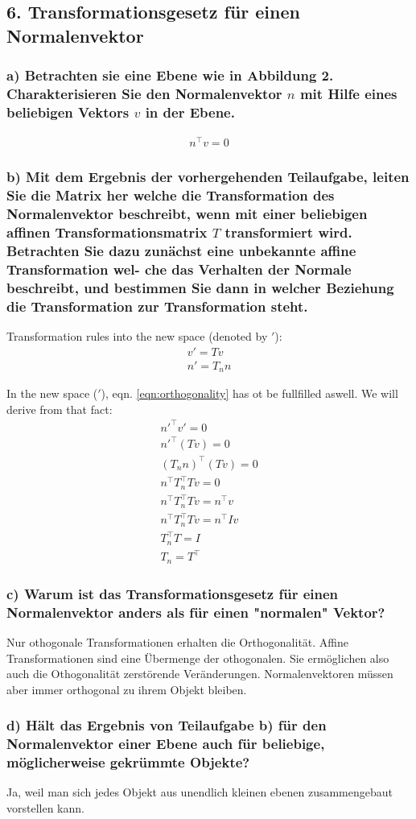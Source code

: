 \documentclass[a4paper,headings=small]{scrartcl}
\numberwithin{equation}{section} %
\numberwithin{figure}{section}   %
\begin{document}
\subsection{6. Transformationsgesetz für einen Normalenvektor}

\subsubsection{a) Betrachten sie eine Ebene wie in Abbildung 2. Charakterisieren Sie den Normalenvektor $n$ mit Hilfe eines beliebigen Vektors $v$ in der Ebene.}

\begin{align}
\label{eqn:orthogonality} n^{\top} v = 0
\end{align}

\subsubsection{b) Mit dem Ergebnis der vorhergehenden Teilaufgabe, leiten Sie die Matrix her welche die Transformation des Normalenvektor beschreibt, wenn mit einer beliebigen affinen Transformationsmatrix
$T$ transformiert wird. Betrachten Sie dazu zunächst eine unbekannte affine Transformation wel-
che das Verhalten der Normale beschreibt, und bestimmen Sie dann in welcher Beziehung die
Transformation zur Transformation steht.}

Transformation rules into the new space (denoted by $'$):
\begin{align}
v' = T v \\
n' = T_n n
\end{align}

In the new space ($'$),
eqn. \ref{eqn:orthogonality} has ot be fullfilled aswell.
We will derive from that fact:
\begin{align}
n'^{\top} v' = 0 \\
n'^{\top} (T v) = 0 \\
(T_n n)^{\top} (T v) = 0 \\
n^{\top} T_n^{\top} T v = 0 \\
n^{\top} T_n^{\top} T v = n^{\top} v \\
n^{\top} T_n^{\top} T v = n^{\top} I v \\
T_n^{\top} T = I \\
T_n = T^{\top}
\end{align}

\subsubsection{c) Warum ist das Transformationsgesetz für einen Normalenvektor anders als für einen "normalen" Vektor?}
Nur othogonale Transformationen erhalten die Orthogonalität. Affine Transformationen sind eine Übermenge der othogonalen. Sie ermöglichen also auch die Othogonalität zerstörende Veränderungen. Normalenvektoren müssen aber immer orthogonal zu ihrem Objekt bleiben.

\subsubsection{d) Hält das Ergebnis von Teilaufgabe b) für den Normalenvektor einer Ebene auch für beliebige, möglicherweise gekrümmte Objekte?}
Ja, weil man sich jedes Objekt aus unendlich kleinen ebenen zusammengebaut vorstellen kann.
\end{document}
